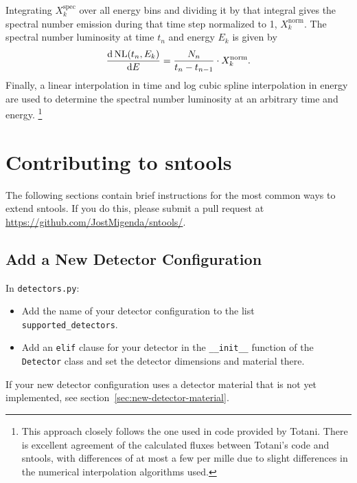 \documentclass[11pt, oneside]{article}
\renewcommand{\d}{\mathrm{d}}
\newcommand{\tdiff}[3][\empty]{\ifx\empty#1
		\frac{\d\,#2}{\d #3}
	\else
		\frac{\d^{#1}\,#2}{\d #3^{#1}}
	\fi} %
\begin{document}
Integrating $X_k^\text{spec}$ over all energy bins and dividing it by that integral gives the spectral number emission during that time step normalized to 1, $X_k^\text{norm}$.
The spectral number luminosity at time $t_n$ and energy $E_k$ is given by
\begin{equation}
\tdiff{\text{NL} (t_n, E_k)}{E} = \frac{N_n}{t_n - t_{n-1}} \cdot X_k^\text{norm}.
\end{equation}
Finally, a linear interpolation in time and log cubic spline interpolation in energy are used to determine the spectral number luminosity at an arbitrary time and energy.%
\footnote{This approach closely follows the one used in code provided by Totani. There is excellent agreement of the calculated fluxes between Totani’s code and sntools, with differences of at most a few per mille due to slight differences in the numerical interpolation algorithms used.}



\section{Contributing to sntools}


The following sections contain brief instructions for the most common ways to extend sntools.
If you do this, please submit a pull request at \url{https://github.com/JostMigenda/sntools/}.


\subsection{Add a New Detector Configuration}\label{sec:new-detector-config}

In \texttt{detectors.py}:
\begin{itemize}
\item Add the name of your detector configuration to the list \texttt{supported\_detectors}.
\item Add an \texttt{elif} clause for your detector in the \texttt{\_\_init\_\_} function of the \texttt{Detector} class and set the detector dimensions and material there.
\end{itemize}

If your new detector configuration uses a detector material that is not yet implemented, see section~\ref{sec:new-detector-material}.
\end{document}
